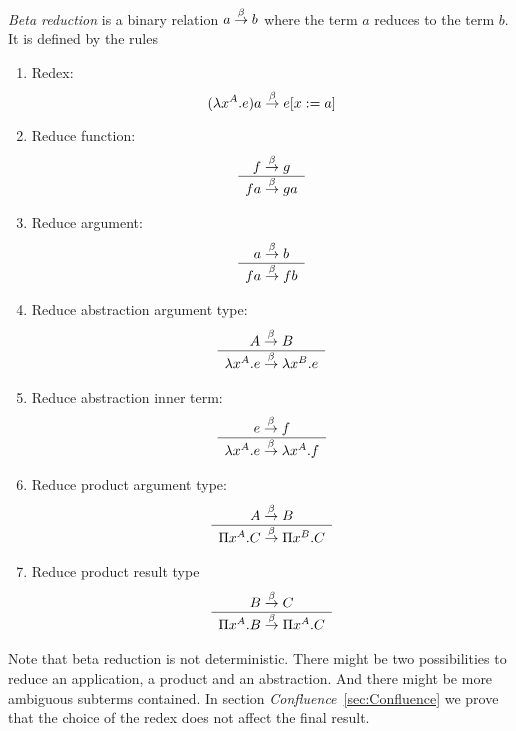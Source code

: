 \begin{definition}
    \emph{Beta reduction}
    is a binary relation $a \stackrel{\beta}{\to} b$ where the term $a$
    reduces to the term $b$. It is defined by the rules
    \begin{enumerate}
        \item Redex:
            $$
                (\lambda x^A. e) a \stackrel{\beta}{\to} e[x:=a]
            $$

        \item Reduce function:
            $$
                \begin{array}{c} 
                    f \stackrel{\beta}{\to} g
                 \\ \hline 
                    f a \stackrel{\beta}{\to} g a
                \end{array}
            $$

        \item Reduce argument:
            $$
                \begin{array}{c} 
                    a \stackrel{\beta}{\to} b
                 \\ \hline 
                    f a \stackrel{\beta}{\to} f b
                \end{array}
            $$

        \item Reduce abstraction argument type:
            $$
                \begin{array}{c} 
                    A \stackrel{\beta}{\to} B
                 \\ \hline 
                    \lambda x^A. e \stackrel{\beta}{\to} \lambda x^B . e
                \end{array}
            $$

        \item Reduce abstraction inner term:
            $$
                \begin{array}{c} 
                    e \stackrel{\beta}{\to} f
                 \\ \hline 
                    \lambda x^A. e \stackrel{\beta}{\to} \lambda x^A. f
                \end{array}
            $$

        \item Reduce product argument type:
            $$
                \begin{array}{c} 
                    A \stackrel{\beta}{\to} B
                 \\ \hline 
                    \Pi x^A. C \stackrel{\beta}{\to} \Pi x^B . C
                \end{array}
            $$

        \item Reduce product result type
            $$
                \begin{array}{c} 
                    B \stackrel{\beta}{\to} C
                 \\ \hline 
                    \Pi x^A. B \stackrel{\beta}{\to} \Pi x^A. C
                \end{array}
            $$
    \end{enumerate}
\end{definition}

Note that beta reduction is not deterministic. There might be two possibilities
to reduce an application, a product and an abstraction. And there might be more
ambiguous subterms contained. In section \emph{Confluence}~\ref{sec:Confluence}
we prove that the choice of the redex does not affect the final result.


